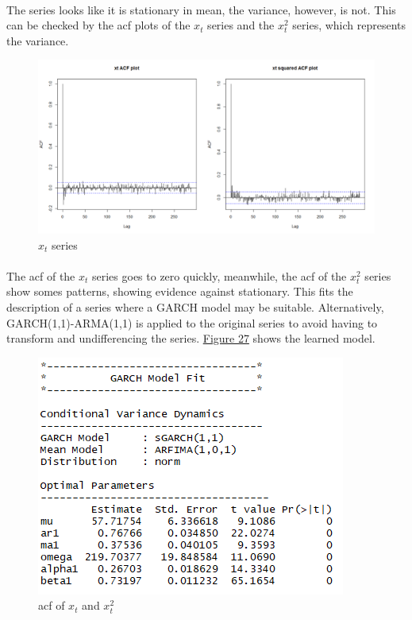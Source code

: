 \documentclass[12pt]{article}
\begin{document}
\paragraph{}
The series looks like it is stationary in mean, the variance, however, is not. This can be checked by the acf plots of the $x_t$ series and the $x_t^2$ series, which represents the variance.
\begin{figure}[H]
  \centering
  \includegraphics[width=\linewidth]{figure25.png}
  \caption{$x_t$ series}
  \label{fig:figure26}
\end{figure}

\paragraph{}
The acf of the $x_t$ series goes to zero quickly, meanwhile, the acf of the $x_t^2$ series show somes patterns, showing evidence against stationary. This fits the description of a series where a GARCH model may be suitable. Alternatively, GARCH(1,1)-ARMA(1,1) is applied to the original series to avoid having to transform and undifferencing the series. \href{figure27}{Figure 27} shows the learned model. 
\begin{figure}[H]
  \centering
  \includegraphics[width=0.5\linewidth]{figure26.png}
  \caption{acf of $x_t$ and $x_t^2$}
  \label{fig:figure27}
\end{figure}
\end{document}
